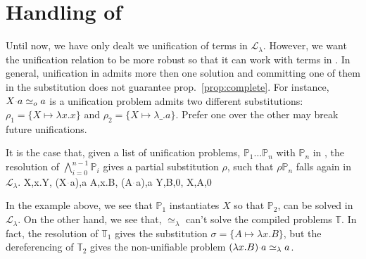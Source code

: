 \documentclass[sigconf,natbib=false,review]{acmart}
\newcommand{\appsep}{\ensuremath{\textcolor{lightgray}{\cdot}}}
\newcommand{\UnifRel}{\ensuremath{\simeq}}
\newcommand{\Uo}{\ensuremath{\UnifRel_o}\xspace}
\newcommand{\Ue}{\ensuremath{\UnifRel_\lambda}\xspace}
\newcommand{\llambda}{\ensuremath{\mathcal{L}_\lambda}\xspace}
\newcommand{\foUnifPb}{\ensuremath{\mathbb{P}}\xspace}
\newcommand{\hoUnifPb}{\ensuremath{\mathbb{T}}\xspace}
\begin{document}
\section{Handling of \notllambda}\label{sec:beta}


Until now, we have only dealt we unification of terms in \llambda. However, we
want the unification relation to be more robust so that it can work with terms
in \notllambda. In general, unification in \notllambda admits more then one
solution and committing one of them in the substitution does not guarantee
prop.~\ref{prop:complete}. For instance, $X \appsep a \Uo a$ is a unification
problem admits two different substitutions: $\rho_1 = \{X \mapsto \lambda x.x\}$
and $\rho_2 = \{X \mapsto \lambda \_.a\}$. Prefer one over the other may break
future unifications.

It is the case that, given a list of unification problems, $\foUnifPb_1\dots
\foUnifPb_n$ with $\foUnifPb_n$ in \notllambda, the resolution of
$\bigwedge_{i=0}^{n-1}\foUnifPb_i$ gives a partial substitution $\rho$, such
that $\rho\foUnifPb_n$ falls again in \llambda.
%
\printAlll
  {{{X,\lambda x.Y},
    {(X\appsep a),a}}}
  {{{A,\lambda x.B},
    {(A\appsep a),a}}}
  {{{Y,B,0},
    {X,A,0}}}
  {{}}

In the example above, we see that $\foUnifPb_1$ instantiates $X$ so that
$\foUnifPb_2$, can be solved in \llambda.
On the other hand, we see that, 
\Ue can't solve the compiled problems \hoUnifPb. In
fact, the resolution of $\hoUnifPb_1$ gives the substitution $\sigma = \{ A
\mapsto \lambda x. B\}$, but the dereferencing of $\hoUnifPb_2$ gives the 
non-unifiable problem $(\lambda x. B) \appsep a \Ue a$.
\end{document}
